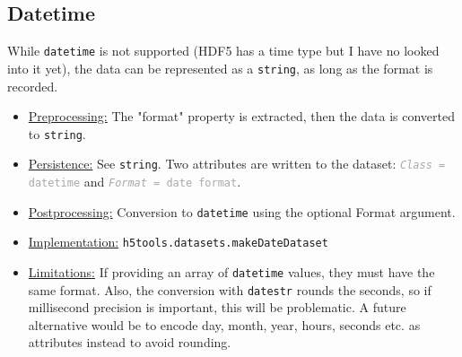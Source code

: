 \documentclass[11pt]{exam}
\newcommand\myfcn[1]{\colorbox{codegray}{\textcolor{codeblue}{\texttt{#1}}}}
\newcommand\matfcn[1]{\textcolor{darkteal}{\texttt{#1}}}
\newcommand\myatt[2]{\textcolor{darkgray}{\texttt{\textit{#1} = #2}}}
\begin{document}
        \subsection{Datetime}
        \noindent While \texttt{datetime} is not supported (HDF5 has a time type but I have no looked into it yet), the data can be represented as a \texttt{string}, as long as the format is recorded. 
        \noindent\begin{itemize}
            \item \underline{Preprocessing:} The "format" property is extracted, then the data is converted to \texttt{string}.
            \item \underline{Persistence:} See \texttt{string}. Two attributes are written to the dataset: \myatt{Class}{datetime} and \myatt{Format}{date format}.
            \item \underline{Postprocessing:} Conversion to \texttt{datetime} using the optional Format argument. 
            \item \underline{Implementation:} \myfcn{h5tools.datasets.makeDateDataset}
            \item \underline{Limitations:} If providing an array of \texttt{datetime} values, they must have the same format. Also, the conversion with \matfcn{datestr} rounds the seconds, so if millisecond precision is important, this will be problematic. A future alternative would be to encode day, month, year, hours, seconds etc. as attributes instead to avoid rounding.  
        \end{itemize}
        
\end{document}
